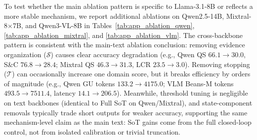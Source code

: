 To test whether the main ablation pattern is specific to Llama-3.1-8B or reflects a more stable mechanism, we report additional ablations on Qwen2.5-14B, Mixtral-8$\times$7B, and Qwen3-VL-8B in Tables~\ref{tab:app_ablation_qwen}, \ref{tab:app_ablation_mixtral}, and \ref{tab:app_ablation_vlm}.
The cross-backbone pattern is consistent with the main-text ablation conclusion: removing evidence organization (\(\mathcal{S}\)) causes clear accuracy degradation (e.g., Qwen QS \(66.1\!\rightarrow\!30.0\), S\&C \(76.8\!\rightarrow\!28.4\); Mixtral QS \(46.3\!\rightarrow\!31.3\), LCR \(23.5\!\rightarrow\!3.0\)).
Removing stopping (\(\mathcal{T}\)) can occasionally increase one domain score, but it breaks efficiency by orders of magnitude (e.g., Qwen GU tokens \(133.2\!\rightarrow\!4175.0\); VLM Beans-M tokens \(493.5\!\rightarrow\!7511.4\), latency \(14.1\!\rightarrow\!206.5\)).
Meanwhile, threshold tuning is negligible on text backbones (identical to Full SoT on Qwen/Mixtral), and state-component removals typically trade short outputs for weaker accuracy, supporting the same mechanism-level claim as the main text: SoT gains come from the full closed-loop control, not from isolated calibration or trivial truncation.

